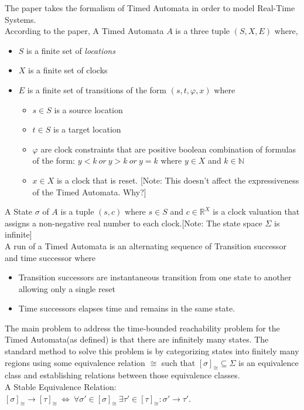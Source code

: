 \documentclass[a4paper,UKenglish,cleveref, autoref, thm-restate]{lipics-v2019}
\begin{document}
The paper takes the formalism of Timed Automata in order to model Real-Time Systems.\\
According to the paper, A Timed Automata $A$ is a three tuple $(S,X,E)$ where,
\begin{itemize}
\item $S$ is a finite set of \textit{locations}
\item $X$ is a finite set of clocks
\item $E$ is a finite set of transitions of the form $(s,t,\varphi,x)$ where
\begin{itemize}
\item $s \in S$ is a source location
\item $t \in S$ is a target location
\item $\varphi$ are clock constraints that are positive boolean combination of formulas of the form: $y<k\ or\  y>k\ or\  y=k$ where $y \in X$ and $k \in \mathbb{N}$
\item $x \in X$ is a clock that is reset. [Note: This doesn't affect the expressiveness of the Timed Automata. Why?]
\end{itemize}
\end{itemize}
\smallskip
A State $\sigma$ of $A$ is a tuple $(s,c)$ where $s \in S$ and $c \in \mathbb{R}^X$ is a clock valuation that assigns a non-negative real number to each clock.[Note: The state space $\Sigma$ is infinite]\\
A run of a Timed Automata is an alternating sequence of Transition successor and time successor where
\begin{itemize}
\item Transition successors are instantaneous transition from one state to another allowing only a single reset
\item Time successors elapses time and remains in the same state.
\smallskip
\end{itemize}
The main problem to address the time-bounded reachability problem for the Timed Automata(as defined) is that there are infinitely many states. The standard method to solve this problem is by categorizing states into finitely many regions using some equivalence relation $\cong$ such that $[ \sigma ]_{\cong} \subseteq \Sigma$ is an equivalence class and establishing relations between those equivalence classes.\\
A Stable Equivalence Relation: $[\sigma]_{\cong} \rightarrow [\tau]_{\cong}\ \iff\  \forall \sigma' \in [\sigma]_{\cong}\ \exists \tau' \in [\tau]_{\cong}: \sigma' \rightarrow \tau'$.\\
\end{document}
